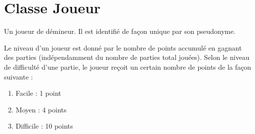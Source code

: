 \section {Classe Joueur}

Un joueur de démineur. Il est identifié de façon unique par son pseudonyme.

Le niveau d'un joueur est donné par le nombre de points accumulé en gagnant des parties (indépendamment du nombre de parties total jouées). Selon le niveau de difficulté d'une partie, le joueur reçoit un certain nombre de points de la façon suivante :

\begin{enumerate}
\item Facile : 1 point
\item Moyen : 4 points
\item Difficile : 10 points
\end{enumerate}

